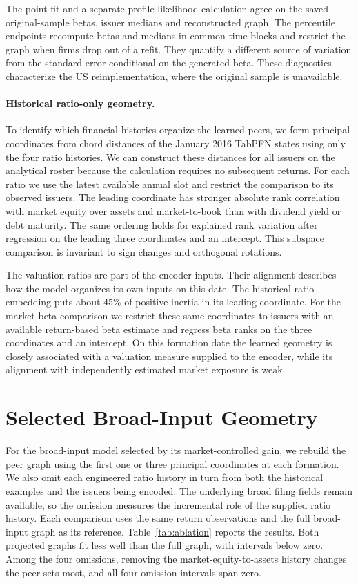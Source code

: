 The point fit and a separate profile-likelihood calculation agree on
the saved original-sample betas, issuer medians and reconstructed
graph. The percentile endpoints recompute betas and medians in common
time blocks and restrict the graph when firms drop out of a refit.
They quantify a different source of variation from the standard error
conditional on the generated beta. These diagnostics
characterize the US reimplementation, where the original sample is unavailable.

\paragraph{Historical ratio-only geometry.}
To identify which financial histories organize the learned peers, we
form principal coordinates from chord distances of the January
2016 TabPFN states using only the four ratio histories. We can
construct these distances for all 
issuers on the analytical roster because the calculation requires
no subsequent returns. For each ratio we use the latest
available annual slot and restrict the comparison to its observed
issuers. The leading coordinate has stronger absolute rank correlation with
market equity over assets and market-to-book than with
dividend yield or debt maturity. The same ordering holds for explained
rank variation after regression on the leading three coordinates and
an intercept. This subspace comparison is invariant to sign changes and
orthogonal rotations.

The valuation ratios are part of the encoder inputs. Their alignment
describes how the model organizes its own inputs on this date.
The historical ratio embedding puts about 45\% of positive inertia
in its leading coordinate. For the market-beta comparison we restrict
these same coordinates to issuers with an available return-based beta
estimate and regress beta ranks on the three coordinates and an intercept.
On this formation date the learned geometry is closely associated
with a valuation measure supplied to the encoder, while its alignment
with independently estimated market exposure is weak.

\section{Selected Broad-Input Geometry}
\label{app:ablation}

For the broad-input model selected by its market-controlled gain, we rebuild
the peer graph using the first one or three principal coordinates at each
formation. We also omit each engineered ratio history in turn from both
the historical examples and the issuers being encoded. The underlying broad
filing fields remain available, so the omission measures the incremental
role of the supplied ratio history. Each comparison uses the same return
observations and the full broad-input graph as its reference.
Table~\ref{tab:ablation} reports the results. Both projected graphs fit
less well than the full graph, with intervals below zero. Among the four
omissions, removing the market-equity-to-assets history changes the peer
sets most, and all four omission intervals span zero.

